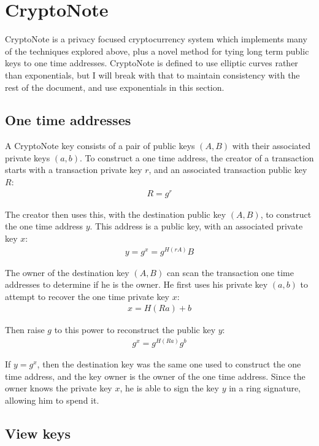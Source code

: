 \documentclass{article}
\begin{document}
\section{CryptoNote}

CryptoNote is a privacy focused cryptocurrency system which implements many of the techniques explored above, plus a novel method for tying long term public keys to one time addresses.  CryptoNote is defined to use elliptic curves rather than exponentials, but I will break with that to maintain consistency with the rest of the document, and use exponentials in this section.


\subsection{One time addresses}

A CryptoNote key consists of a pair of public keys $(A, B)$ with their associated private keys $(a, b)$.  To construct a one time address, the creator of a transaction starts with a transaction private key $r$, and an associated transaction public key $R$:
\begin{align}
  R=g^r
\end{align}

The creator then uses this, with the destination public key $(A, B)$, to construct the one time address $y$.  This address is a public key, with an associated private key $x$:
\begin{align}
  y = g^x = g^{H(rA)} B
\end{align}

The owner of the destination key $(A, B)$ can scan the transaction one time addresses to determine if he is the owner.  He first uses his private key $(a, b)$ to attempt to recover the one time private key $x$:
\begin{align}
	x = H(Ra) + b
\end{align}

Then raise $g$ to this power to reconstruct the public key $y$:
\begin{align}
  g^x = g^{H(Ra)} g^b
\end{align}

If $y = g^x$, then the destination key was the same one used to construct the one time address, and the key owner is the owner of the one time address.  Since the owner knows the private key $x$, he is able to sign the key $y$ in a ring signature, allowing him to spend it.


\subsection{View keys}
\end{document}
